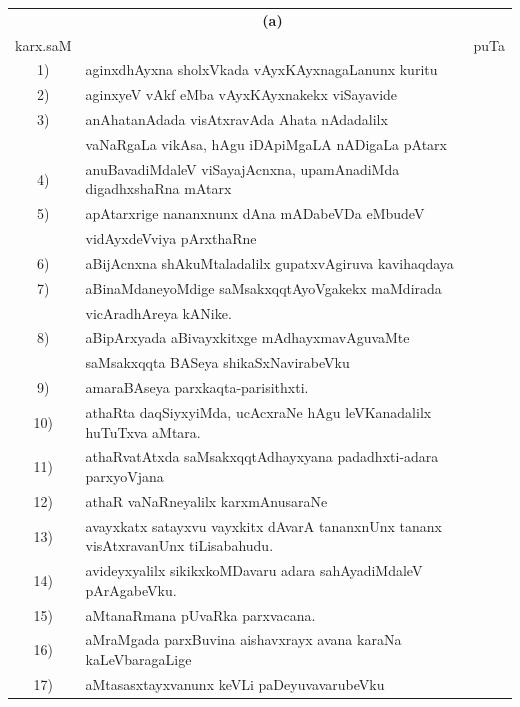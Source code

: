 {\begin{longtable}{@{}cp{7.4cm}r}
   &      \multicolumn{1}{c}{\textbf{(a)}} & \\[0.5cm]
karx.saM &                                             & puTa\\[0.5cm]
1) & aginxdhAyxna sholxVkada vAyxKAyxnagaLanunx kuritu & \pageref{page208}\\
2) & aginxyeV vAkf eMba vAyxKAyxnakekx viSayavide & \pageref{page211}\\
3) & anAhatanAdada visAtxravAda Ahata nAdadalilx  & \\
   & vaNaRgaLa vikAsa, hAgu iDApiMgaLA nADigaLa pAtarx & \pageref{page211}\\
4) & anuBavadiMdaleV viSayajAcnxna, upamAnadiMda digadhxshaRna mAtarx & \pageref{page166}\\
5) & apAtarxrige nananxnunx dAna mADabeVDa eMbudeV & \\
   & vidAyxdeVviya pArxthaRne  &  \pageref{page48}\\
6) & aBijAcnxna shAkuMtaladalilx gupatxvAgiruva kavihaqdaya & \pageref{page234}\\  
7) & aBinaMdaneyoMdige saMsakxqqtAyoVgakekx maMdirada & \\
   & vicAradhAreya kANike.                   & \pageref{page63}\\
8) & aBipArxyada aBivayxkitxge mAdhayxmavAguvaMte & \\
   & saMsakxqqta BASeya shikaSxNavirabeVku & \pageref{page52}\\
9) & amaraBAseya parxkaqta-parisithxti. & \pageref{page25}\\
10) & athaRta daqSiyxyiMda, ucAcxraNe hAgu leVKanadalilx huTuTxva aMtara. & \pageref{page180}\\
11) & athaRvatAtxda saMsakxqqtAdhayxyana padadhxti-adara parxyoVjana & \pageref{page4}\\
12) & athaR vaNaRneyalilx karxmAnusaraNe & \pageref{page114}\\
13) & avayxkatx satayxvu vayxkitx dAvarA tananxnUnx tananx visAtxravanUnx tiLisabahudu. & \pageref{page108}\\
14) & avideyxyalilx sikikxkoMDavaru adara sahAyadiMdaleV pArAgabeVku. &\pageref{page160}\\
15) & aMtanaRmana pUvaRka parxvacana. & \pageref{page83}\\
16) & aMraMgada parxBuvina aishavxrayx avana karaNa kaLeVbaragaLige  & \pageref{page190}\\
17) & aMtasasxtayxvanunx keVLi paDeyuvavarubeVku & \pageref{page108}\\ 

\end{longtable}}
